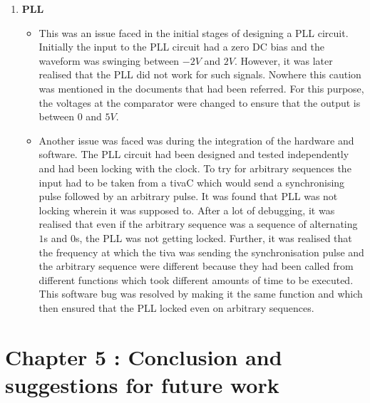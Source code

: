 \documentclass{article}
\begin{document}
\begin{enumerate}
\begin{itemize}
  \end{itemize}
\item \textbf{PLL}
  \begin{itemize}
  \item This was an issue faced in the initial stages of designing a PLL circuit. Initially the input to the PLL circuit had a zero DC bias and the waveform was swinging between $-2 V$ and $ 2 V$. However, it was later realised that the PLL did not work for such signals. Nowhere this caution was mentioned in the documents that had been referred. For this purpose, the voltages at the comparator were changed to ensure that the output is between $0$ and $5 V$.
  \item Another issue was faced was during the integration of the hardware and software. The PLL circuit had been designed and tested independently and had been locking with the clock. To try for arbitrary sequences the input had to be taken from a tivaC which would send a synchronising pulse followed by an arbitrary pulse. It was found that PLL was not locking wherein it was supposed to. After a lot of debugging, it was realised that even if the arbitrary sequence was a sequence of alternating $1$s and $0$s, the PLL was not getting locked. Further, it was realised that the frequency at which the tiva was sending the synchronisation pulse and the arbitrary sequence were different because they had been called from different functions which took different amounts of time to be executed. This software bug was resolved by making it the same function and which then ensured that the PLL locked even on arbitrary sequences.
  \end{itemize}
\end{enumerate}

\section{Chapter 5 : Conclusion and suggestions for future work}
\end{document}
